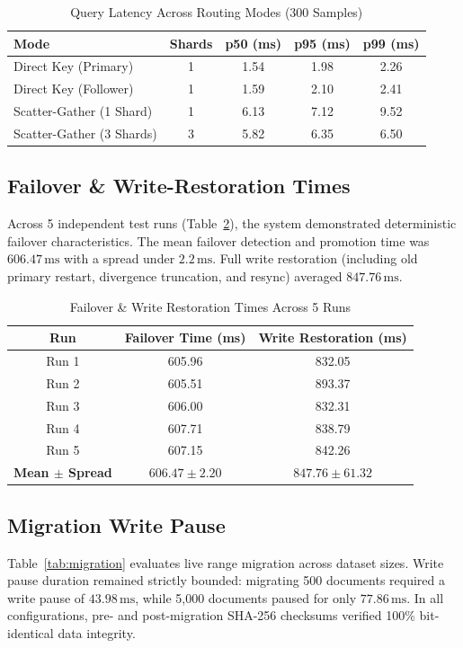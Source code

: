\documentclass[10pt,journal,compsoc]{IEEEtran}
\begin{document}
\begin{table}[ht]
\centering
\caption{Query Latency Across Routing Modes (300 Samples)}
\label{tab:query_lat}
\begin{tabular}{lcccc}
\toprule
\textbf{Mode} & \textbf{Shards} & \textbf{p50 (ms)} & \textbf{p95 (ms)} & \textbf{p99 (ms)} \\
\midrule
Direct Key (Primary)  & 1 & 1.54 & 1.98 & 2.26 \\
Direct Key (Follower) & 1 & 1.59 & 2.10 & 2.41 \\
Scatter-Gather (1 Shard) & 1 & 6.13 & 7.12 & 9.52 \\
Scatter-Gather (3 Shards) & 3 & 5.82 & 6.35 & 6.50 \\
\bottomrule
\end{tabular}
\end{table}

\subsection{Failover \& Write-Restoration Times}
Across 5 independent test runs (Table~\ref{tab:failover}), the system demonstrated deterministic failover characteristics. The mean failover detection and promotion time was $606.47\,\text{ms}$ with a spread under $2.2\,\text{ms}$. Full write restoration (including old primary restart, divergence truncation, and resync) averaged $847.76\,\text{ms}$.

\begin{table}[ht]
\centering
\caption{Failover \& Write Restoration Times Across 5 Runs}
\label{tab:failover}
\begin{tabular}{ccc}
\toprule
\textbf{Run} & \textbf{Failover Time (ms)} & \textbf{Write Restoration (ms)} \\
\midrule
Run 1 & 605.96 & 832.05 \\
Run 2 & 605.51 & 893.37 \\
Run 3 & 606.00 & 832.31 \\
Run 4 & 607.71 & 838.79 \\
Run 5 & 607.15 & 842.26 \\
\midrule
\textbf{Mean $\pm$ Spread} & $\mathbf{606.47 \pm 2.20}$ & $\mathbf{847.76 \pm 61.32}$ \\
\bottomrule
\end{tabular}
\end{table}

\subsection{Migration Write Pause}
Table~\ref{tab:migration} evaluates live range migration across dataset sizes. Write pause duration remained strictly bounded: migrating 500 documents required a write pause of $43.98\,\text{ms}$, while 5,000 documents paused for only $77.86\,\text{ms}$. In all configurations, pre- and post-migration SHA-256 checksums verified 100\% bit-identical data integrity.
\end{document}
